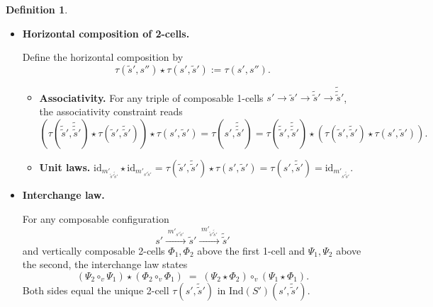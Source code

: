 \documentclass[a4paper,10pt]{article}
\theoremstyle{plain}
\theoremstyle{definition}
\newtheorem{definition}[theorem]{Definition}
\theoremstyle{remark}
\newcommand{\vh}{\star}
\newcommand{\vv}{\circ_{v}}
\newcommand{\cc}[2]{m'_{#1 #2}}
\begin{document}
\begin{definition}
\begin{itemize}
\begin{itemize}
          \item \textbf{Unit laws.} Both left and right unit laws read
          \[
            \tau(s', \tilde{s}') \vv \tau(s', \tilde{s}') \;=\; \tau(s', \tilde{s}'),
          \]
          which holds by definition.

          \end{itemize}
        
      \item \textbf{Horizontal composition of 2-cells.}

          Define the horizontal composition by
          \[
            \tau(\tilde{s}', s'') \vh \tau(s', \tilde{s}') := \tau(s', s'').
          \]

          \begin{itemize}
            \item \textbf{Associativity.}
                  For any triple of composable 1-cells
                  $s' \to \tilde{s}' \to \tilde{\tilde{s}}' \to \tilde{\tilde{\tilde{s}}}'$, the associativity constraint reads
                  \[
                    (\tau(\tilde{\tilde{s}}', \tilde{\tilde{\tilde{s}}}') \vh \tau(\tilde{s}', \tilde{\tilde{s}}')) \vh \tau(s', \tilde{s}')
                    = \tau(s', \tilde{\tilde{\tilde{s}}}') = \tau(\tilde{\tilde{s}}', \tilde{\tilde{\tilde{s}}}') \vh (\tau(\tilde{s}', \tilde{\tilde{s}}') \vh
                    \tau(s', \tilde{s}')).
                  \]
            
            \item \textbf{Unit laws.}
                  $\mathrm{id}_{\cc{\tilde{s}'}{\tilde{\tilde{s}}'}} \vh \mathrm{id}_{\cc{s'}{\tilde{s}'}}
                    = \tau(\tilde{s}', \tilde{\tilde{s}}') \vh \tau(s', \tilde{s}')
                    = \tau(s', \tilde{\tilde{s}}')
                    = \mathrm{id}_{\cc{s'}{\tilde{\tilde{s}}'}}$.
          \end{itemize}


    \item \textbf{Interchange law.}

          For any composable configuration
          \[
            s' \xrightarrow{\;\cc{s'}{\tilde{s}'}\;} \tilde{s}'
            \xrightarrow{\;\cc{\tilde{s}'}{\tilde{\tilde{s}}'}\;} \tilde{\tilde{s}}'
          \]
          and vertically composable 2-cells $\Phi_1, \Phi_2$ above the first 1-cell and
          $\Psi_1, \Psi_2$ above the second, the interchange law states
          \[
            (\Psi_2 \vv \Psi_1) \vh (\Phi_2 \vv \Phi_1)
            \;=\;
            (\Psi_2 \vh \Phi_2) \vv (\Psi_1 \vh \Phi_1).
          \]
          Both sides equal the unique 2-cell $\tau(s', \tilde{\tilde{s}}')$ in $\mathrm{Ind}(S')(s',\tilde{\tilde{s}}')$.


\end{itemize}
\end{definition}
\end{document}
